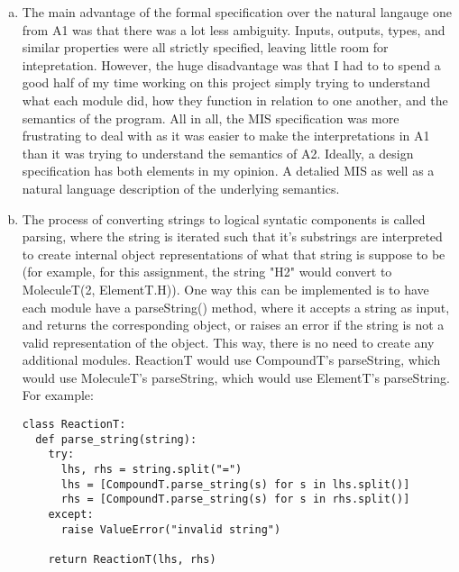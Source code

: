 \documentclass[12pt]{article}
\begin{document}
\begin{enumerate}[a)]

\item The main advantage of the formal specification over the natural langauge one from A1 was that there was a lot less ambiguity. Inputs, outputs, types, and similar properties were all strictly specified, leaving little room for intepretation. However, the huge disadvantage was that I had to to spend a good half of my time working on this project simply trying to understand what each module did, how they function in relation to one another, and the semantics of the program. All in all, the MIS specification was more frustrating to deal with as it was easier to make the interpretations in A1 than it was trying to understand the semantics of A2. Ideally, a design specification has both elements in my opinion. A detalied MIS as well as a natural language description of the underlying semantics.

\item The process of converting strings to logical syntatic components is called parsing, where the string is iterated such that it's substrings are interpreted to create internal object representations of what that string is suppose to be (for example, for this assignment, the string "H2" would convert to MoleculeT(2, ElementT.H)). One way this can be implemented is to have each module have a parseString() method, where it accepts a string as input, and returns the corresponding object, or raises an error if the string is not a valid representation of the object. This way, there is no need to create any additional modules. ReactionT would use CompoundT's parseString, which would use MoleculeT's parseString, which would use ElementT's parseString. For example:
\begin{lstlisting}
class ReactionT:
  def parse_string(string):
    try:
      lhs, rhs = string.split("=")
      lhs = [CompoundT.parse_string(s) for s in lhs.split()]
      rhs = [CompoundT.parse_string(s) for s in rhs.split()]
    except:
      raise ValueError("invalid string")

    return ReactionT(lhs, rhs)
\end{lstlisting}


\end{enumerate}
\end{document}
